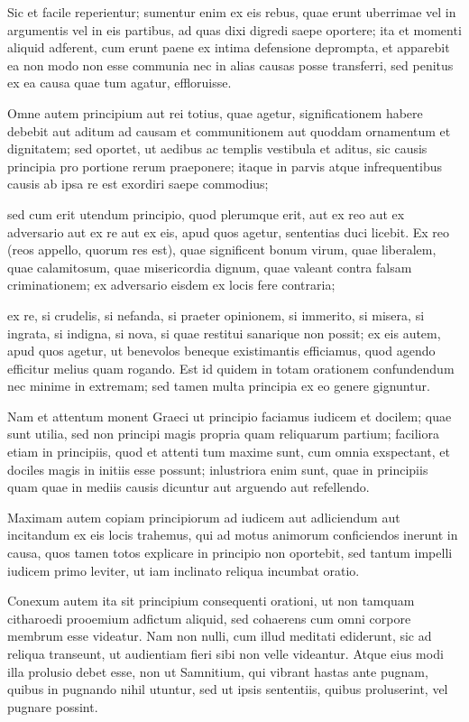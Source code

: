  Sic et facile reperientur; sumentur enim ex eis rebus, quae erunt uberrimae vel in argumentis vel in eis partibus, ad quas dixi digredi saepe oportere; ita et momenti aliquid adferent, cum erunt paene ex intima defensione deprompta, et apparebit ea non modo non esse communia nec in alias causas posse transferri, sed penitus ex ea causa quae tum agatur, effloruisse.

 Omne autem principium aut rei totius, quae agetur, significationem habere debebit aut aditum ad causam et communitionem aut quoddam ornamentum et dignitatem; sed oportet, ut aedibus ac templis vestibula et aditus, sic causis principia pro portione rerum praeponere; itaque in parvis atque infrequentibus causis ab ipsa re est exordiri saepe commodius;

 sed cum erit utendum principio, quod plerumque erit, aut ex reo aut ex adversario aut ex re aut ex eis, apud quos agetur, sententias duci licebit. Ex reo (reos appello, quorum res est), quae significent bonum virum, quae liberalem, quae calamitosum, quae misericordia dignum, quae valeant contra falsam criminationem; ex adversario eisdem ex locis fere contraria;

 ex re, si crudelis, si nefanda, si praeter opinionem, si immerito, si misera, si ingrata, si indigna, si nova, si quae restitui sanarique non possit; ex eis autem, apud quos agetur, ut benevolos beneque existimantis efficiamus, quod agendo efficitur melius quam rogando. Est id quidem in totam orationem confundendum nec minime in extremam; sed tamen multa principia ex eo genere gignuntur.

 Nam et attentum monent Graeci ut principio faciamus iudicem et docilem; quae sunt utilia, sed non principi magis propria quam reliquarum partium; faciliora etiam in principiis, quod et attenti tum maxime sunt, cum omnia exspectant, et dociles magis in initiis esse possunt; inlustriora enim sunt, quae in principiis quam quae in mediis causis dicuntur aut arguendo aut refellendo.

 Maximam autem copiam principiorum ad iudicem aut adliciendum aut incitandum ex eis locis trahemus, qui ad motus animorum conficiendos inerunt in causa, quos tamen totos explicare in principio non oportebit, sed tantum impelli iudicem primo leviter, ut iam inclinato reliqua incumbat oratio.

 Conexum autem ita sit principium consequenti orationi, ut non tamquam citharoedi prooemium adfictum aliquid, sed cohaerens cum omni corpore membrum esse videatur. Nam non nulli, cum illud meditati ediderunt, sic ad reliqua transeunt, ut audientiam fieri sibi non velle videantur. Atque eius modi illa prolusio debet esse, non ut Samnitium, qui vibrant hastas ante pugnam, quibus in pugnando nihil utuntur, sed ut ipsis sententiis, quibus proluserint, vel pugnare possint.


